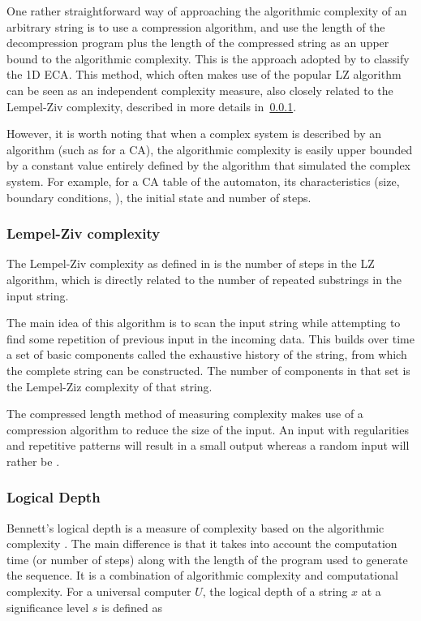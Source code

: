 One rather straightforward way of approaching the algorithmic complexity of an
arbitrary string is to use a compression algorithm, and use the length of the
decompression program plus the length of the compressed string as an upper bound
to the algorithmic complexity. This is the approach adopted by
\textcite{zenilCompressionBasedInvestigationDynamical2010} to classify the 1D
\ac{ECA}. This method, which often makes use of the popular LZ algorithm can be
seen as an independent complexity measure, also closely related to the
Lempel-Ziv complexity, described in more details in~\ref{subsection:lempel-ziv}.

However, it is worth noting that when a complex system is described by an
algorithm (such as for a \ac{CA}), the algorithmic complexity is easily upper
bounded by a constant value entirely defined by the algorithm that simulated the
complex system. For example, for a \ac{CA} table of the automaton, its
characteristics (size, boundary conditions, \etc), the initial state and number
of steps.

\subsubsection{Lempel-Ziv complexity}\label{subsection:lempel-ziv}
The Lempel-Ziv complexity as defined in
\parencite{lempelComplexityFiniteSequences1976} is the number of steps in the LZ
algorithm, which is directly related to the number of repeated substrings in the
input string.

The main idea of this algorithm is to scan the input string while attempting to
find some repetition of previous input in the incoming data. This builds over
time a set of basic components called the exhaustive history of the string, from
which the complete string can be constructed. The number of components in that
set is the Lempel-Ziz complexity of that string.

The compressed length method of measuring complexity makes use of a compression
algorithm to reduce the size of the input. An input with regularities and
repetitive patterns will result in a small output whereas a random input will
rather be .


\subsubsection{Logical Depth}

Bennett's logical depth is a measure of complexity based on the algorithmic
complexity \parencite{bennettDissipationInformationComputational1988,
  bennettLogicalDepthPhysical1995}. The main difference is that it takes into
account the computation time (or number of steps) along with the length of the
program used to generate the sequence. It is a combination of algorithmic
complexity and computational complexity. For a universal computer $U$, the
logical depth of a string $x$ at a significance level $s$ is defined as

